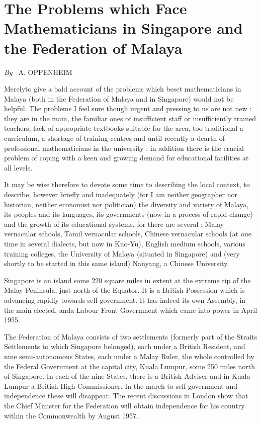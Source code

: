 \chapter[The Problems which Face Mathematicians in Singapore...]{The Problems which Face Mathematicians in Singapore and the Federation of Malaya}

\begin{center}
{\em By~} A. OPPENHEIM
\end{center}

\bigskip

Merely\pageoriginale to give a bald account of the problems which beset mathematicians in Malaya (both in the Federation of Malaya and in Singapore) would not be helpful. The problems I feel sure though urgent and pressing to us are not new : they are in the main, the familiar ones of insufficient staff or insufficiently trained teachers, lack of appropriate textbooks suitable for the area, too traditional a curriculum, a shortage of training centres and until recently a dearth of professional mathematicians in the university : in addition there is the crucial problem of coping with a keen and growing demand for educational facilities at all levels.

It may be wise therefore to devote some time to describing the local context, to describe, however briefly and inadequately (for I am neither geographer nor historian, neither economist nor politician) the diversity and variety of Malaya, its peoples and its languages, its governments (now in a process of rapid change) and the growth of its educational systems, for there are several : Malay vernacular schools, Tamil vernacular schools, Chinese vernacular schools (at one time in several dialects, but now in Kuo-Yu), English medium schools, various training colleges, the University of Malaya (situated in Singapore) and (very shortly to be started in this same island) Nanyang, a Chinese University.

Singapore is an island some 220 square miles in extent at the extreme tip of the Malay Peninsula, just north of the Equator. It is a British Possession which is advancing rapidly towards self-government. It has indeed its own Assembly, in the main elected, and\pageoriginale a Labour Front Government which came into power in April 1955.

The Federation of Malaya consists of two settlements (formerly part of the Straits Settlements to which Singapore belonged), each under a British Resident, and nine semi-autonomous States, each under a Malay Ruler, the whole controlled by the Federal Government at the capital city, Kuala Lumpur, some 250 miles north of Singapore. In each of the nine States, there is a British Adviser and in Kuala Lumpur a British High Commissioner. In the march to self-government and independence these will disappear. The recent discussions in London show that the Chief Minister for the Federation will obtain independence for his country within the Commonwealth by August 1957.

